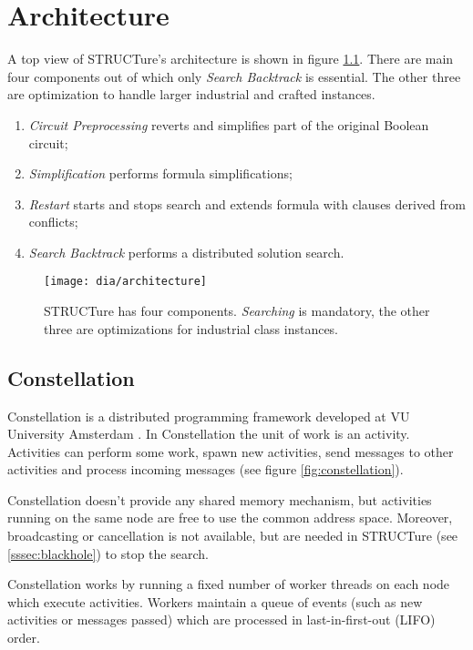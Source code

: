 \chapter{Architecture}
\label{chap:architecture}

A top view of STRUCTure's architecture is shown in figure
\ref{fig:architecture}. There are main four components
out of which only \emph{Search Backtrack} is essential.
The other three are optimization to handle larger
industrial and crafted instances.
\begin{enumerate}
  \item \emph{Circuit Preprocessing} reverts and simplifies 
  part of the original Boolean circuit;
  \item \emph{Simplification} performs formula simplifications;
  \item \emph{Restart} starts and stops search and extends
  formula with clauses derived from conflicts;
  \item \emph{Search Backtrack} performs a distributed solution search.
\end{enumerate}

\begin{figure}
  \centering
  \texttt{[image: dia/architecture]}
  \caption{STRUCTure has four components. \emph{Searching}
  is mandatory, the other three are optimizations
  for industrial class instances.}
  \label{fig:architecture}
\end{figure}


\section{Constellation}

Constellation is a distributed programming framework developed at VU University
Amsterdam \cite{mine:constellation}. In Constellation the unit of work is
an activity. Activities can perform some work, spawn new activities,
send messages to other activities and process incoming messages
(see figure \ref{fig:constellation}).

Constellation doesn't provide any shared memory mechanism, but
activities running on the same node are free to use the common
address space. Moreover, broadcasting or cancellation is not
available, but are needed in STRUCTure (see \ref{sssec:blackhole})
to stop the search.

Constellation works by running a fixed number of worker threads
on each node which execute activities.  Workers maintain a
queue of events (such as new activities or messages passed) which are
processed in last-in-first-out (LIFO) order.

